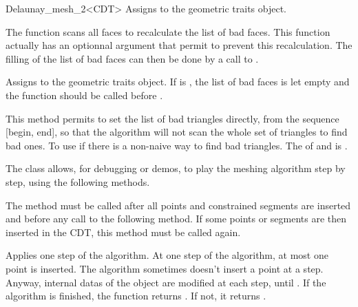 \begin{ccRefClass}{Delaunay_mesh_2<CDT>}
{ Assigns  to the geometric traits object. }

\begin{ccAdvanced}
  The function  scans all faces to recalculate the
  list of bad faces. This function actually has an optionnal argument that
  permit to prevent this recalculation. The filling of the list of bad
  faces can then be done by a call to .
  
  { Assigns  to the geometric traits object. If
     is , the list of bad faces is
    let empty and the function  should be called before
    .}

                   { This method permits to set the list of bad triangles
                     directly, from the sequence [begin, end], so that the
                     algorithm will not scan the whole set of triangles to
                     find bad ones. To use if there is a non-naive way to
                     find bad triangles.  \ccPrecond The 
                     of  and  is .}

\end{ccAdvanced}


\begin{ccAdvanced}

The \ccRefName{} class allows, for debugging or demos, to play the
meshing algorithm step by step, using the following methods.

         { The method must be called after all points and constrained
           segments are inserted and before any call to the following
           method. If some points or segments are then inserted 
           in the CDT, this method must be called again. }

         { Applies one step of the algorithm. At one step of the algorithm,
           at most one point is inserted. The algorithm
           sometimes doesn't insert a point at a step. Anyway,
           internal datas of the \ccRefName{} object are modified at
           each step, until . If the algorithm
           is finished, the function returns . If not, it 
           returns .}

\end{ccAdvanced}

\end{ccRefClass}

